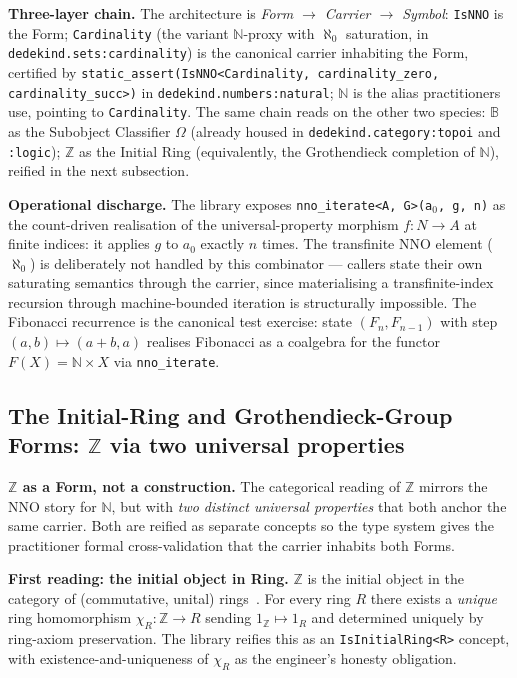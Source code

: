 \documentclass[11pt, a4paper]{report}
\begin{document}
\textbf{Three-layer chain.} The architecture is \emph{Form $\to$ Carrier $\to$ Symbol}: \texttt{IsNNO} is the Form; \texttt{Cardinality} (the variant $\mathbb{N}$-proxy with $\aleph_0$ saturation, in \texttt{dedekind.sets:cardinality}) is the canonical carrier inhabiting the Form, certified by \texttt{static\_assert(IsNNO<Cardinality, cardinality\_zero, cardinality\_succ>)} in \texttt{dedekind.numbers:natural}; $\mathbb{N}$ is the alias practitioners use, pointing to \texttt{Cardinality}. The same chain reads on the other two species: $\mathbb{B}$ as the Subobject Classifier $\Omega$ (already housed in \texttt{dedekind.category:topoi} and \texttt{:logic}); $\mathbb{Z}$ as the Initial Ring (equivalently, the Grothendieck completion of $\mathbb{N}$), reified in the next subsection.

\textbf{Operational discharge.} The library exposes \texttt{nno\_iterate<A, G>(a$_0$, g, n)} as the count-driven realisation of the universal-property morphism $f : N \to A$ at finite indices: it applies $g$ to $a_0$ exactly $n$ times. The transfinite NNO element ($\aleph_0$) is deliberately not handled by this combinator --- callers state their own saturating semantics through the carrier, since materialising a transfinite-index recursion through machine-bounded iteration is structurally impossible. The Fibonacci recurrence is the canonical test exercise: state $(F_n, F_{n-1})$ with step $(a, b) \mapsto (a+b, a)$ realises Fibonacci as a coalgebra for the functor $F(X) = \mathbb{N} \times X$ via \texttt{nno\_iterate}.

\subsection{The Initial-Ring and Grothendieck-Group Forms: \texorpdfstring{$\mathbb{Z}$}{Z} via two universal properties}
\label{subsec:initial-ring}

\textbf{$\mathbb{Z}$ as a Form, not a construction.} The categorical reading of $\mathbb{Z}$ mirrors the NNO story for $\mathbb{N}$, but with \emph{two distinct universal properties} that both anchor the same carrier. Both are reified as separate concepts so the type system gives the practitioner formal cross-validation that the carrier inhabits both Forms.

\textbf{First reading: the initial object in Ring.} $\mathbb{Z}$ is the initial object in the category of (commutative, unital) rings~\cite{maclane1971categories}. For every ring $R$ there exists a \emph{unique} ring homomorphism $\chi_R : \mathbb{Z} \to R$ sending $1_\mathbb{Z} \mapsto 1_R$ and determined uniquely by ring-axiom preservation. The library reifies this as an \texttt{IsInitialRing<R>} concept, with existence-and-uniqueness of $\chi_R$ as the engineer's honesty obligation.
\end{document}
